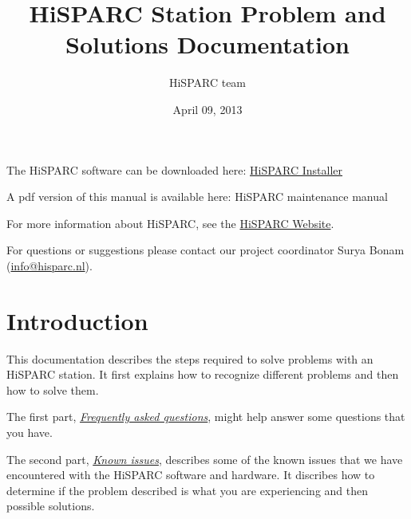 \documentclass[a4paper,11pt,english]{sphinxmanual}
\title{HiSPARC Station Problem and Solutions Documentation}
\date{April 09, 2013}
\author{HiSPARC team}
\begin{document}
\maketitle
\tableofcontents
{}\label{index::doc}


The HiSPARC software can be downloaded here: \href{http://www.hisparc.nl/downloads/software/}{HiSPARC Installer}

A pdf version of this manual is available here: HiSPARC maintenance manual

For more information about HiSPARC, see the \href{http://www.hisparc.nl/}{HiSPARC Website}.

For questions or suggestions please contact our project coordinator
Surya Bonam (\href{mailto:info@hisparc.nl}{info@hisparc.nl}).


\chapter{Introduction}
\label{introduction:introduction}\label{introduction::doc}\label{introduction:welcome-to-the-hisparc-maintenance-documentation}
This documentation describes the steps required to solve problems with an HiSPARC station.  It first explains how to recognize different problems and then how to solve them.

The first part, {\hyperref[faq::doc]{\emph{Frequently asked questions}}}, might help answer some questions that you have.

The second part, {\hyperref[known-issues::doc]{\emph{Known issues}}}, describes some of the known issues that we have encountered with the HiSPARC software and hardware. It discribes how to determine if the problem described is what you are experiencing and then possible solutions.
\end{document}
